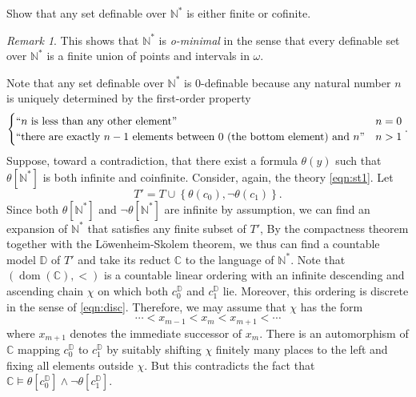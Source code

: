 \documentclass[10pt,letterpaper,cm]{nupset}
\theoremstyle{definition}
\theoremstyle{theorem}
\theoremstyle{remark}
\newtheorem*{remark}{Remark}
\newcommand{\C}{\mathbb C}
\newcommand{\D}{\mathbb D}
\newcommand{\N}{\mathbb N}
\newcommand{\1}{\mathbb{1}}
\newcommand{\0}{\vec 0}
\DeclareMathOperator{\dom}{dom}
\begin{document}
\begin{problem}[4.]
Show that any set definable over $\N^{\ast}$ is either finite or cofinite. 
\begin{remark}
This shows that $\N^{\ast}$ is \textit{o-minimal} in the sense that every definable set over $\N^{\ast}$ is a finite union of points and intervals in $\omega$. 
\end{remark}
\end{problem}
\begin{solution}
Note that any set definable over $\N^{\ast}$ is $0$-definable  because any natural number $n$ is uniquely determined by the first-order property
\[
\begin{cases}
 ``n \text{ is less than any other element}" & n=0
\\``\text{there are exactly }n-1\text{ elements between $0$ (the bottom element) and }n"  & n>1
\end{cases}.
\]
Suppose, toward a contradiction, that there exist a formula $\theta(y)$ such that $\theta\left[\N^{\ast}\right]$ is both infinite and coinfinite. Consider, again, the theory \eqref{eqn:st1}. Let $$T' = T \cup \left\{\theta(c_0), \neg{\theta(c_1)}\right\}.$$ Since both $\theta\left[\N^{\ast}\right]$ and $\neg{\theta\left[\N^{\ast}\right]}$ are infinite by assumption, we can find an expansion of $\N^{\ast}$ that satisfies any finite subset of $T'$, By the compactness theorem together with the L\"owenheim-Skolem theorem, we thus can find a countable model $\D$ of $T'$ and take its reduct $\C$ to the language of $\N^{\ast}$. Note that $\left(\dom(\C), < \right)$ is a countable linear ordering with an  infinite descending and ascending chain $\chi$ on which both $c_0^{\D}$ and $c_1^{\D}$ lie. Moreover, this ordering is discrete in the sense of \eqref{eqn:disc}.
Therefore, we may assume that $\chi$ has the form
\[
 \cdots < x_{m-1} < x_m < x_{m+1} < \cdots
\] where $x_{m+1}$ denotes the immediate successor of $x_m$. There is an automorphism of $\C$ mapping $c_0^{\D}$ to $c_1^{\D}$ by suitably shifting $\chi$ finitely many places to the left and fixing all elements outside $\chi$. But this contradicts the fact that $\C \models \theta\left[c_0^{\D}\right] \land \neg{\theta\left[c_1^{\D}\right]}$.
\end{solution}
\end{document}
